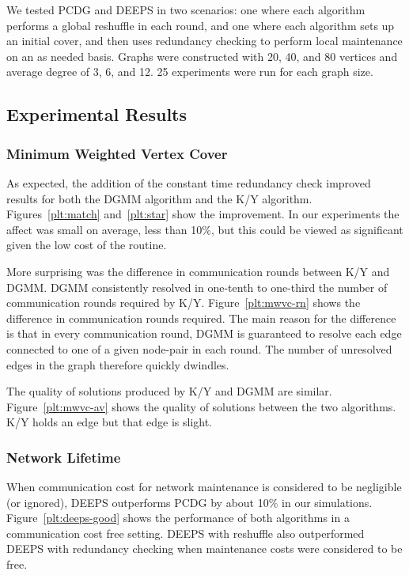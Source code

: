 We tested PCDG and DEEPS in two scenarios: one where each algorithm performs a global reshuffle in each round, and one where each algorithm sets up an initial cover, and then uses redundancy checking to perform local maintenance on an as needed basis. Graphs were constructed with 20, 40, and 80 vertices and average degree of 3, 6, and 12. 25 experiments were run for each graph size.
 
\subsection{Experimental Results}
\label{sub:exp-results}
\subsubsection{Minimum Weighted Vertex Cover}
\label{sub:mwvc-results}
As expected, the addition of the constant time redundancy check improved results for both the DGMM algorithm and the K/Y algorithm. Figures~\ref{plt:match} and~\ref{plt:star} show the improvement. In our experiments the affect was small on average, less than 10\%, but this could be viewed as significant given the low cost of the routine. 


More surprising was the difference in communication rounds between K/Y and DGMM. DGMM consistently resolved in one-tenth to one-third the number of communication rounds required by K/Y. Figure~\ref{plt:mwvc-rn} shows the difference in communication rounds required. The main reason for the difference is that in every communication round, DGMM is guaranteed to resolve each edge connected to one of a given node-pair in each round. The number of unresolved edges in the graph therefore quickly dwindles.


The quality of solutions produced by K/Y and DGMM are similar. Figure~\ref{plt:mwvc-av} shows the quality of solutions between the two algorithms. K/Y holds an edge but that edge is slight.
  


\subsubsection{Network Lifetime}
\label{sub:netlife-results}
When communication cost for network maintenance is considered to be negligible (or ignored), DEEPS outperforms PCDG by about 10\% in our simulations. Figure~\ref{plt:deeps-good} shows the performance of both algorithms in a communication cost free setting. DEEPS with reshuffle also outperformed DEEPS with redundancy checking when maintenance costs were considered to be free.


